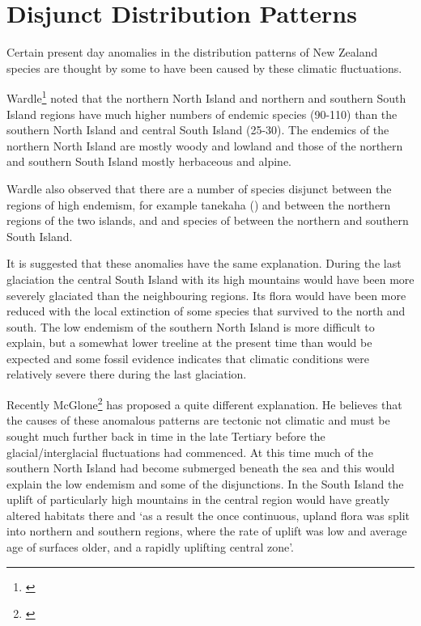 \section{Disjunct Distribution Patterns}

Certain present day anomalies in the distribution patterns of New Zealand species are thought by some to have been caused by these climatic fluctuations.

Wardle\footnote{\cite{wardle1963evolution}} noted that the northern North Island and northern and southern South Island regions have much higher numbers of endemic species (90-110) than the southern North Island and central South Island (25-30).
The endemics of the northern North Island are mostly woody and lowland and those of the northern and southern South Island mostly herbaceous and alpine.

Wardle also observed that there are a number of species disjunct between the regions of high endemism, for example tanekaha () and  between the northern regions of the two islands, and  and species of  between the northern and southern South Island.

It is suggested that these anomalies have the same explanation.
During the last glaciation the central South Island with its high mountains would have been more severely glaciated than the neighbouring regions.
Its flora would have been more reduced with the local extinction of some species that survived to the north and south.
The low endemism of the southern North Island is more difficult to explain, but a somewhat lower treeline at the present time than would be expected and some fossil evidence indicates that climatic conditions were relatively severe there during the last glaciation.

Recently McGlone\footnote{\cite{mcglone1985plant}} has proposed a quite different explanation.
He believes that the causes of these anomalous patterns are tectonic not climatic and must be sought much further back in time in the late Tertiary before the glacial/interglacial fluctuations had commenced.
At this time much of the southern North Island had become submerged beneath the sea and this would explain the low endemism and some of the disjunctions.
In the South Island the uplift of particularly high mountains in the central region would have greatly altered habitats there and `as a result the once continuous, upland flora was split into northern and southern regions, where the rate of uplift was low and average age of surfaces older, and a rapidly uplifting central zone'.

